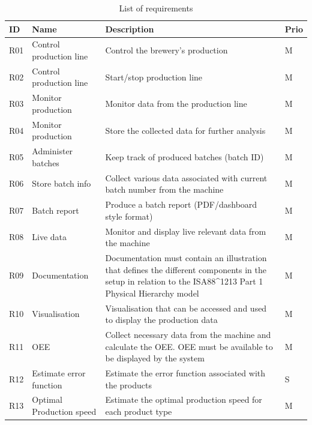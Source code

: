 \begin{table}[H]
    \begin{tabularx}{\textwidth}{|>{\RaggedRight}p{1cm}|>{\RaggedRight}p{4cm}|>{\RaggedRight}X|>{\RaggedRight}p{1cm}|}
        \hline
        \textbf{ID} & \textbf{Name} & \textbf{Description} & \textbf{Prio} \\
        \hline
        R01 & Control production line & Control the brewery's production & M \\
        \hline
        R02 & Control production line & Start/stop production line & M \\
        \hline
        R03 & Monitor production & Monitor data from the production line & M \\
        \hline
        R04 & Monitor production & Store the collected data for further analysis & M \\
        \hline
        R05 & Administer batches & Keep track of produced batches (batch ID) & M \\
        \hline
        R06 & Store batch info & Collect various data associated with current batch number from the machine & M \\
        \hline
        R07 & Batch report & Produce a batch report (PDF/dashboard style format) & M \\
        \hline
        R08 & Live data & Monitor and display live relevant data from the machine & M \\
        \hline
        R09 & Documentation & Documentation must contain an illustration that defines the different components in the setup in relation to the ISA88\^{}1213 Part 1 Physical Hierarchy model & M \\
        \hline
        R10 & Visualisation & Visualisation that can be accessed and used to display the production data & M \\
        \hline
        R11 & OEE & Collect necessary data from the machine and calculate the OEE. OEE must be available to be displayed by the system & M \\
        \hline
        R12 & Estimate error function & Estimate the error function associated with the products & S \\
        \hline
        R13 & Optimal Production speed & Estimate the optimal production speed for each product type & M \\
        \hline
    \end{tabularx}
    \caption{List of requirements} 
    \label{table:Requirements}
\end{table}


